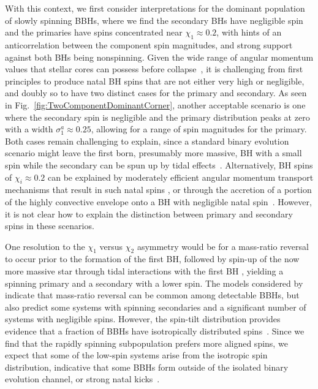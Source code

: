 \documentclass[twocolumn,usenames,dvipsnames,linenumbers]{aastex631}
\begin{document}
With this context, we first consider interpretations for the dominant population of slowly spinning \acp{BBH}, where we find the secondary \acp{BH} have negligible spin and the primaries have spins  concentrated near $\chi_1 \approx 0.2$, 
with hints of an anticorrelation between the component spin magnitudes, and strong support against both \acp{BH} being nonspinning.
Given the wide range of angular momentum values that stellar cores can possess before collapse~\citep[e.g.,][]{Qin:2018sxk}, it is challenging from first principles to produce natal \ac{BH} spins that are not either very high or negligible, and doubly so to have two distinct cases for the primary and secondary.
As seen in Fig.~\ref{fig:TwoComponentDominantCorner}, another acceptable scenario is one where the secondary spin is negligible and the primary distribution peaks at zero with a width $\sigma^a_1 \approx 0.25$, allowing for a range of spin magnitudes for the primary.
Both cases remain challenging to explain, since a standard binary evolution scenario might leave the first born, presumably more massive, \ac{BH} with a small spin while the secondary can be spun up by tidal effects~\citep{Hotokezaka:2017esv,Zaldarriaga:2017qkw,Qin:2018vaa}.
Alternatively, \ac{BH} spins of $\chi_i \approx 0.2$ can be explained by moderately efficient angular momentum transport mechanisms that result in such natal spins \citep{Belczynski:2017gds}, or through the accretion of a portion of the highly convective envelope onto a \ac{BH} with negligible natal spin~\citep{Antoni2022}.
However, it is not clear how to explain the distinction between primary and secondary spins in these scenarios.

One resolution to the $\chi_1$ versus $\chi_2$ asymmetry would be for a mass-ratio reversal to occur prior to the formation of the first \ac{BH}, followed by spin-up of the now more massive star through tidal interactions with the first \ac{BH} \citep[e.g.,][]{Gerosa:2013laa,Olejak:2021iux,Zevin:2022wrw,Broekgaarden:2022nst}, yielding a spinning primary and a secondary with a lower spin.
The models considered by~\cite{Broekgaarden:2022nst} indicate that mass-ratio reversal can be common among detectable \acp{BBH}, but also predict some systems with spinning secondaries and a significant number of systems with negligible spins.
However, the spin-tilt distribution provides evidence that a fraction of \acp{BBH} have isotropically distributed spins~\citep{KAGRA:2021duu}. 
Since we find that the rapidly spinning subpopulation prefers more aligned spins, we expect that some of the low-spin systems arise from the isotropic spin distribution,
indicative that some \acp{BBH} form outside of the isolated binary evolution channel, 
or strong natal kicks~\citep[e.g.,][]{Callister:2020vyz}.
\end{document}
